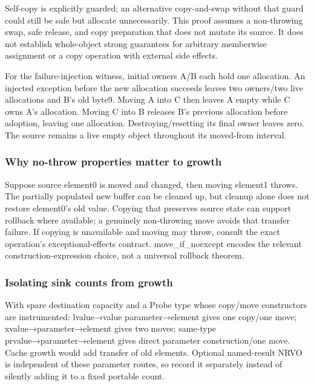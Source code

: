 Self-copy is explicitly guarded; an alternative copy-and-swap without that guard could still be safe but allocate unnecessarily. This proof assumes a non-throwing swap, safe release, and copy preparation that does not mutate its source. It does not establish whole-object strong guarantees for arbitrary memberwise assignment or a copy operation with external side effects.

For the failure-injection witness, initial owners A/B each hold one allocation. An injected exception before the new allocation succeeds leaves two owners/two live allocations and B's old byte9. Moving A into C then leaves A empty while C owns A's allocation. Moving C into B releases B's previous allocation before adoption, leaving one allocation. Destroying/resetting its final owner leaves zero. The source remains a live empty object throughout its moved-from interval.

\subsubsection{Why no-throw properties matter to growth}\label{why-no-throw-properties-matter-to-growth}

Suppose source element0 is moved and changed, then moving element1 throws. The partially populated new buffer can be cleaned up, but cleanup alone does not restore element0's old value. Copying that preserves source state can support rollback where available; a genuinely non-throwing move avoids that transfer failure. If copying is unavailable and moving may throw, consult the exact operation's exceptional-effects contract. move\_if\_noexcept encodes the relevant construction-expression choice, not a universal rollback theorem.

\subsubsection{Isolating sink counts from growth}\label{isolating-sink-counts-from-growth}

With spare destination capacity and a Probe type whose copy/move constructors are instrumented: lvalue→value parameter→element gives one copy/one move; xvalue→parameter→element gives two moves; same-type prvalue→parameter→element gives direct parameter construction/one move. Cache growth would add transfer of old elements. Optional named-result NRVO is independent of these parameter routes, so record it separately instead of silently adding it to a fixed portable count.

